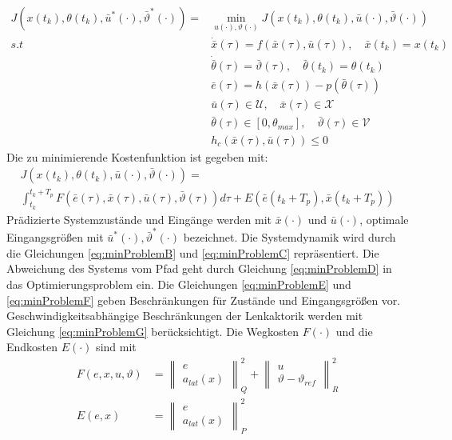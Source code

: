 \begin{subequations}
\begin{align}
    J(x(t_k),\theta(t_k),\bar{u}^{*}(\cdot),\bar{\vartheta}^{*}(\cdot)) = &\underset{u(\cdot), \vartheta(\cdot)}{\min} J(x(t_k), \theta(t_k), \bar{u}(\cdot), \bar{\vartheta}(\cdot)) \label{eq:minProblemA}\\
    s.t \hspace{30pt} &\dot{\bar{x}}(\tau) = f(\bar{x}(\tau), \bar{u}(\tau)), \quad \bar{x}(t_k) = x(t_k) \label{eq:minProblemB}\\
    &\dot{\bar{\theta}}(\tau) = \bar{\vartheta}(\tau), \quad \bar{\theta}(t_k) = \theta(t_k) \label{eq:minProblemC}\\
    &\bar{e}(\tau) = h(\bar{x}(\tau)) - p(\bar{\theta}(\tau)) \label{eq:minProblemD}\\
    &\bar{u}(\tau) \in \mathcal{U}, \quad \bar{x}(\tau) \in \mathcal{X} \label{eq:minProblemE}\\
    &\bar{\theta}(\tau) \in [0, \theta_{max}], \quad \bar{\vartheta}(\tau) \in \mathcal{V} \label{eq:minProblemF}\\
    &h_c(\bar{x}(\tau), \bar{u}(\tau)) \leq 0 \label{eq:minProblemG}
\end{align}
\end{subequations}
\noindent Die zu minimierende Kostenfunktion ist gegeben mit:
\begin{multline}
    J(x(t_k),\theta(t_k),\bar{u}(\cdot),\bar{\vartheta}(\cdot)) = \\ \int_{t_k}^{t_k + T_p} F(\bar{e}(\tau),\bar{x}(\tau),\bar{u}(\tau),\bar{\vartheta}(\tau))d\tau + E(\bar{e}(t_k+T_p),\bar{x}(t_k+T_p))
    \label{eq:cost_function_mpfc}
\end{multline}
\noindent Prädizierte Systemzustände und Eingänge werden mit $\bar{x}(\cdot)$ und $\bar{u}(\cdot)$, optimale Eingangsgrößen mit $\bar{u}^{*}(\cdot),\bar{\vartheta}^{*}(\cdot)$ bezeichnet. Die Systemdynamik wird durch die Gleichungen \ref{eq:minProblemB} und \ref{eq:minProblemC} repräsentiert. Die Abweichung des Systems vom Pfad geht durch Gleichung \ref{eq:minProblemD} in das Optimierungsproblem ein. Die Gleichungen \ref{eq:minProblemE} und \ref{eq:minProblemF} geben Beschränkungen für Zustände und Eingangsgrößen vor. Geschwindigkeitsabhängige Beschränkungen der Lenkaktorik werden mit Gleichung \ref{eq:minProblemG} berücksichtigt. 
\noindent Die Wegkosten $F(\cdot)$ und die Endkosten $E(\cdot)$ sind mit
\begin{align}
    F(e, x, u, \vartheta) &= \left\| \begin{matrix} e \\a_{lat}(x) \end{matrix} \right\|_Q^2 + \left\| \begin{matrix} u \\ \vartheta - \vartheta_{ref} \end{matrix} \right\|_R^2 \\
    E(e, x) &= \left\| \begin{matrix} e \\ a_{lat}(x) \end{matrix} \right\|_P^2
\end{align}
